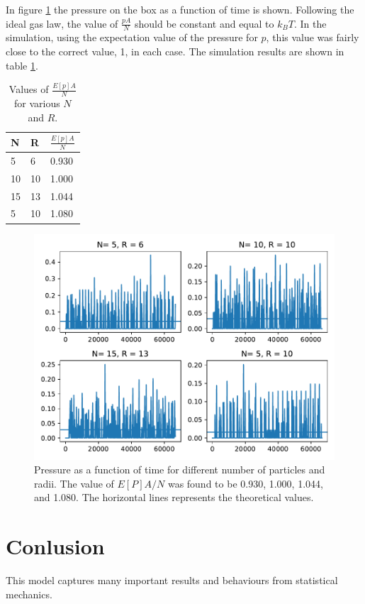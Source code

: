 \documentclass[a4paper,12pt]{article}
\begin{document}
In figure \ref{fig:pressures} the pressure on the box as a function of time is shown.
Following the ideal gas law, the value of $\frac{p A}{N}$ should be constant and equal to $k_B T$.
In the simulation, using the expectation value of the pressure for $p$, this value was fairly close to the correct value, 1, in each case.
The simulation results are shown in table \ref{tab:pressures}.

\begin{table}[h!]
  \centering
  \begin{tabular}{lll}
    N& R& $\frac{E[p] A}{N}$\\
    \hline
    5& 6& 0.930\\
    10& 10& 1.000\\
    15& 13& 1.044\\
    5& 10& 1.080
  \end{tabular}
  \caption{Values of $\frac{E[p] A}{N}$ for various $N$ and $R$.\label{tab:pressures}}
\end{table}

\begin{figure}[htp]
  \centering
  \includegraphics[width=.75\textwidth]{media/pressures}
  \caption{Pressure as a function of time for different number of particles and radii.
    The value of $E[P] A /N$ was found to be 0.930, 1.000, 1.044, and 1.080.
    The horizontal lines represents the theoretical values.
    \label{fig:pressures}}
\end{figure}

\section{Conlusion}
This model captures many important results and behaviours from statistical mechanics.
\end{document}

